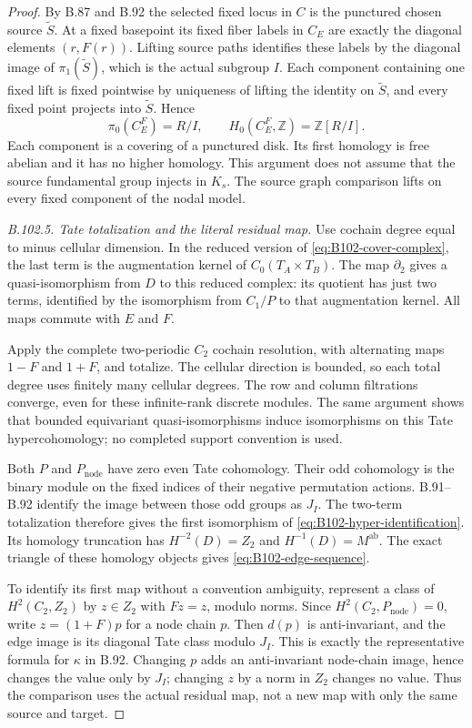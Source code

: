 \begin{proof}
By B.87 and B.92 the selected fixed locus in $C$ is the punctured
chosen source $\widetilde S$. At a fixed basepoint its fixed fiber
labels in $C_E$ are exactly the diagonal elements $(r,F(r))$.
Lifting source paths identifies these labels by the diagonal image
of $\pi_1(\widetilde S)$, which is the actual subgroup $I$.
Each component containing one fixed lift is fixed pointwise by
uniqueness of lifting the identity on $\widetilde S$, and every
fixed point projects into $\widetilde S$. Hence
\begin{equation}\label{eq:B102-fixed-components}
 \pi_0(C_E^F)=R/I,\qquad H_0(C_E^F,\mathbb Z)=\mathbb Z[R/I].
\end{equation}
Each component is a covering of a punctured disk. Its first
homology is free abelian and it has no higher homology. This
argument does not assume that the source fundamental group
injects in $K_s$. The source graph comparison lifts on every
fixed component of the nodal model.

\emph{B.102.5. Tate totalization and the literal residual map.}
Use cochain degree equal to minus cellular dimension. In the
reduced version of \eqref{eq:B102-cover-complex}, the last term is
the augmentation kernel of $C_0(T_A\times T_B)$. The map
$\partial_2$ gives a quasi-isomorphism from $D$ to this reduced
complex: its quotient has just two terms, identified by the
isomorphism from $C_1/P$ to that augmentation kernel. All maps
commute with $E$ and $F$.

Apply the complete two-periodic $C_2$ cochain resolution, with
alternating maps $1-F$ and $1+F$, and totalize. The cellular
direction is bounded, so each total degree uses finitely many
cellular degrees. The row and column filtrations converge, even
for these infinite-rank discrete modules. The same argument shows
that bounded equivariant quasi-isomorphisms induce isomorphisms on
this Tate hypercohomology; no completed support convention is used.

Both $P$ and $P_{\mathrm{node}}$ have zero even Tate cohomology.
Their odd cohomology is the binary module on the fixed indices
of their negative permutation actions. B.91--B.92 identify the
image between those odd groups as $J_I$. The two-term totalization
therefore gives the first isomorphism of
\eqref{eq:B102-hyper-identification}. Its homology truncation has
$H^{-2}(D)=Z_2$ and $H^{-1}(D)=M^{\mathrm{ab}}$. The exact triangle
of these homology objects gives \eqref{eq:B102-edge-sequence}.

To identify its first map without a convention ambiguity, represent
a class of $H^2(C_2,Z_2)$ by $z\in Z_2$ with $Fz=z$, modulo norms.
Since $H^2(C_2,P_{\mathrm{node}})=0$, write $z=(1+F)p$ for a node
chain $p$. Then $d(p)$ is anti-invariant, and the edge image is
its diagonal Tate class modulo $J_I$. This is exactly the
representative formula for $\kappa$ in B.92. Changing $p$ adds an
anti-invariant node-chain image, hence changes the value only by
$J_I$; changing $z$ by a norm in $Z_2$ changes no value. Thus the
comparison uses the actual residual map, not a new map with only
the same source and target.


\end{proof}
